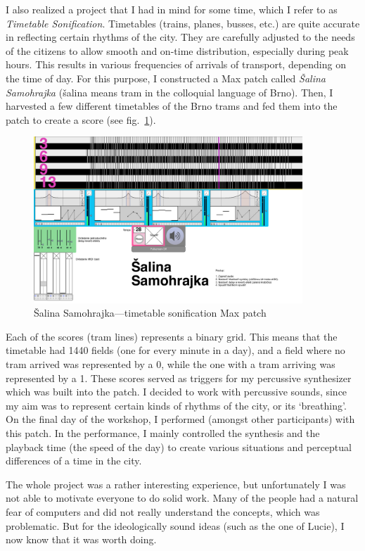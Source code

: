 \documentclass[12pt,a4paper,oneside]{report}
\begin{document}
I also realized a project that I had in mind for some time, which I refer to as \emph{Timetable Sonification}. Timetables (trains, planes, busses, etc.) are quite accurate in reflecting certain rhythms of the city. They are carefully adjusted to the needs of the citizens to allow smooth and on-time distribution, especially during peak hours. This results in various frequencies of arrivals of transport, depending on the time of day. For this purpose, I constructed a Max patch called \emph{Šalina Samohrajka} (šalina means tram in the colloquial language of Brno). Then, I harvested a few different timetables of the Brno trams and fed them into the patch to create a score (see fig.~\ref{fig:salina}).

\begin{figure}  
  \centering
    \includegraphics[width=0.9\textwidth]{img/salina}
        \caption{Šalina Samohrajka---timetable sonification Max patch}
        \label{fig:salina}
\end{figure}

Each of the scores (tram lines) represents a binary grid. This means that the timetable had 1440 fields (one for every minute in a day), and a field where no tram arrived was represented by a 0, while the one with a tram arriving was represented by a 1. These scores served as triggers for my percussive synthesizer which was built into the patch. I decided to work with percussive sounds, since my aim was to represent certain kinds of rhythms of the city, or its `breathing'. On the final day of the workshop, I performed (amongst other participants) with this patch. In the performance, I mainly controlled the synthesis and the playback time (the speed of the day) to create various situations and perceptual differences of a time in the city. 

The whole project was a rather interesting experience, but unfortunately I was not able to motivate everyone to do solid work. Many of the people had a natural fear of computers and did not really understand the concepts, which was problematic. But for the ideologically sound ideas (such as the one of Lucie), I now know that it was worth doing.
\end{document}
